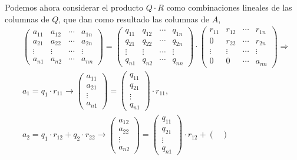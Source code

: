 Podemos ahora considerar el producto $Q\cdot R$ como combinaciones lineales de las columnas de $Q$, que dan como resultado las columnas de $A$,
\begin{align*}
&\begin{pmatrix}
a_{11}& a_{12}& \cdots & a_{1n}\\
a_{21}& a_{22}& \cdots & a_{2n}\\
\vdots & \vdots & \cdots & \vdots\\
a_{n1}& a_{n2}& \cdots & a_{nn}
\end{pmatrix}=\begin{pmatrix}
q_{11}& q_{12}& \cdots & q_{1n}\\
q_{21}& q_{22}& \cdots & q_{2n}\\
\vdots & \vdots & \cdots & \vdots\\
q_{n1}& q_{n2}& \cdots & q_{nn}
\end{pmatrix}\cdot \begin{pmatrix}
r_{11}& r_{12}& \cdots & r_{1n}\\
0 & r_{22}& \cdots & r_{2n}\\
\vdots & \vdots & \cdots & \vdots\\
0& 0& \cdots & a_{nn}
\end{pmatrix} \Rightarrow\\
&a_1=q_1\cdot r_{11} \rightarrow \begin{pmatrix}
a_{11}\\
a_{21}\\
\vdots \\
a_{n1}
\end{pmatrix}=\begin{pmatrix}
q_{11}\\
q_{21}\\
\vdots\\
q_{n1}
\end{pmatrix} \cdot r_{11},\\
&a_2=q_1\cdot r_{12}+ q_2\cdot r_{22} \rightarrow \begin{pmatrix}
a_{12}\\
a_{22}\\
\vdots \\
a_{n2}
\end{pmatrix}=\begin{pmatrix}
q_{11}\\
q_{21}\\
\vdots\\
q_{n1}
\end{pmatrix}\cdot r_{12}+\begin{pmatrix}

\end{pmatrix}
\end{align*}
